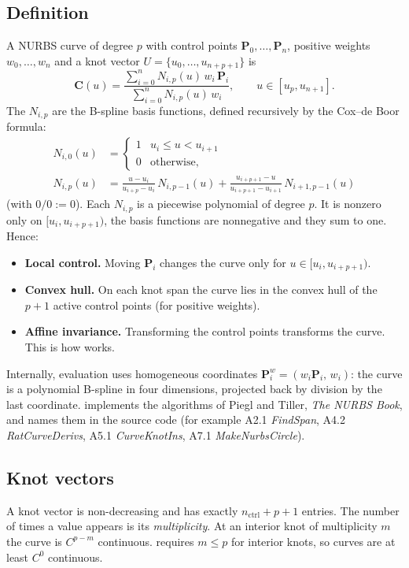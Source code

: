 \subsection{Definition}
A NURBS curve of degree $p$ with control points $\mathbf P_0,\dots,\mathbf P_n$, positive weights
$w_0,\dots,w_n$ and a knot vector $U=\{u_0,\dots,u_{n+p+1}\}$ is
\begin{equation}
  \mathbf C(u) = \frac{\sum_{i=0}^{n} N_{i,p}(u)\, w_i\, \mathbf P_i}
                      {\sum_{i=0}^{n} N_{i,p}(u)\, w_i},
  \qquad u \in [u_p, u_{n+1}] .
\end{equation}
The $N_{i,p}$ are the B-spline basis functions, defined recursively by the Cox--de Boor formula:
\begin{align}
  N_{i,0}(u) &= \begin{cases} 1 & u_i \le u < u_{i+1} \\ 0 & \text{otherwise,} \end{cases}\\
  N_{i,p}(u) &= \frac{u-u_i}{u_{i+p}-u_i}\,N_{i,p-1}(u)
              + \frac{u_{i+p+1}-u}{u_{i+p+1}-u_{i+1}}\,N_{i+1,p-1}(u)
\end{align}
(with $0/0 := 0$). Each $N_{i,p}$ is a piecewise polynomial of degree $p$. It is nonzero only on
$[u_i, u_{i+p+1})$, the basis functions are nonnegative and they sum to one. Hence:
\begin{itemize}
  \item \textbf{Local control.} Moving $\mathbf P_i$ changes the curve only for
    $u\in[u_i,u_{i+p+1})$.
  \item \textbf{Convex hull.} On each knot span the curve lies in the convex hull of the $p+1$
    active control points (for positive weights).
  \item \textbf{Affine invariance.} Transforming the control points transforms the curve. This is
    how  works.
\end{itemize}
Internally, evaluation uses homogeneous coordinates $\mathbf P^w_i = (w_i\mathbf P_i,\, w_i)$:
the curve is a polynomial B-spline in four dimensions, projected back by division by the last
coordinate. \NF{} implements the algorithms of Piegl and Tiller, \emph{The NURBS Book}, and names
them in the source code (for example A2.1 \emph{FindSpan}, A4.2 \emph{RatCurveDerivs}, A5.1
\emph{CurveKnotIns}, A7.1 \emph{MakeNurbsCircle}).

\subsection{Knot vectors}
A knot vector is non-decreasing and has exactly $n_{\text{ctrl}}+p+1$ entries. The number of
times a value appears is its \emph{multiplicity}. At an interior knot of multiplicity $m$ the
curve is $C^{p-m}$ continuous. \NF{} requires $m\le p$ for interior knots, so curves are at
least $C^0$ continuous.


